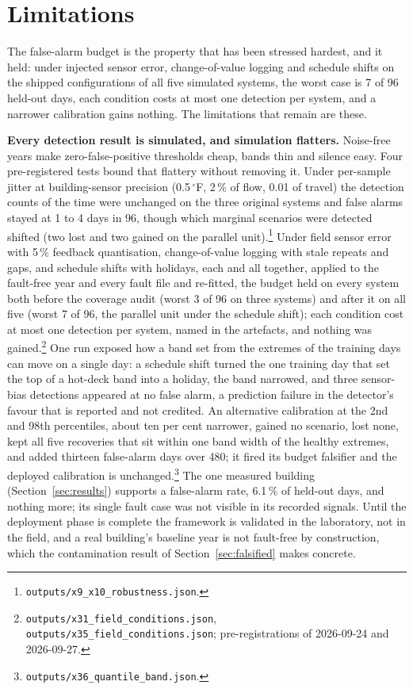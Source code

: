\documentclass[11pt,letterpaper]{article}
\begin{document}
\section{Limitations}
\label{sec:limitations}

The false-alarm budget is the property that has been stressed hardest, and it held: under injected sensor error, change-of-value logging and schedule shifts on the shipped configurations of all five simulated systems, the worst case is 7 of 96 held-out days, each condition costs at most one detection per system, and a narrower calibration gains nothing. The limitations that remain are these.

\textbf{Every detection result is simulated, and simulation flatters.} Noise-free years make zero-false-positive thresholds cheap, bands thin and silence easy. Four pre-registered tests bound that flattery without removing it. Under per-sample jitter at building-sensor precision (0.5\,$^\circ$F, 2\,\% of flow, 0.01 of travel) the detection counts of the time were unchanged on the three original systems and false alarms stayed at 1 to 4 days in 96, though which marginal scenarios were detected shifted (two lost and two gained on the parallel unit).\footnote{\texttt{outputs/x9\_x10\_robustness.json}.} Under field sensor error with 5\,\% feedback quantisation, change-of-value logging with stale repeats and gaps, and schedule shifts with holidays, each and all together, applied to the fault-free year and every fault file and re-fitted, the budget held on every system both before the coverage audit (worst 3 of 96 on three systems) and after it on all five (worst 7 of 96, the parallel unit under the schedule shift); each condition cost at most one detection per system, named in the artefacts, and nothing was gained.\footnote{\texttt{outputs/x31\_field\_conditions.json}, \texttt{outputs/x35\_field\_conditions.json}; pre-registrations of 2026-09-24 and 2026-09-27.} One run exposed how a band set from the extremes of the training days can move on a single day: a schedule shift turned the one training day that set the top of a hot-deck band into a holiday, the band narrowed, and three sensor-bias detections appeared at no false alarm, a prediction failure in the detector's favour that is reported and not credited. An alternative calibration at the 2nd and 98th percentiles, about ten per cent narrower, gained no scenario, lost none, kept all five recoveries that sit within one band width of the healthy extremes, and added thirteen false-alarm days over 480; it fired its budget falsifier and the deployed calibration is unchanged.\footnote{\texttt{outputs/x36\_quantile\_band.json}.} The one measured building (Section~\ref{sec:results}) supports a false-alarm rate, 6.1\,\% of held-out days, and nothing more; its single fault case was not visible in its recorded signals. Until the deployment phase is complete the framework is validated in the laboratory, not in the field, and a real building's baseline year is not fault-free by construction, which the contamination result of Section~\ref{sec:falsified} makes concrete.
\end{document}
